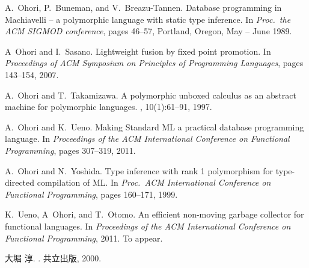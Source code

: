 \documentclass{jbook}
\begin{document}
\begin{thebibliography}{10}
A.~Ohori, P.~Buneman, and V.~Breazu-Tannen.
\newblock Database programming in {Machiavelli} -- a polymorphic language with
  static type inference.
\newblock In {\em Proc.\ the ACM SIGMOD conference}, pages 46--57, Portland,
  Oregon, May -- June 1989.

A~Ohori and I.~Sasano.
\newblock Lightweight fusion by fixed point promotion.
\newblock In {\em Proceedings of ACM Symposium on Principles of Programming
  Languages}, pages 143--154, 2007.

A.~Ohori and T.~Takamizawa.
\newblock A polymorphic unboxed calculus as an abstract machine for polymorphic
  languages.
, 10(1):61--91, 1997.

A.~Ohori and K.~Ueno.
\newblock Making {Standard ML} a practical database programming language.
\newblock In {\em Proceedings of the ACM International Conference on Functional
  Programming}, pages 307--319, 2011.

A.~Ohori and N.~Yoshida.
\newblock Type inference with rank 1 polymorphism for type-directed compilation
  of {ML}.
\newblock In {\em Proc.\ ACM International Conference on Functional
  Programming}, pages 160--171, 1999.

K.~Ueno, A~Ohori, and T.~Otomo.
\newblock An efficient non-moving garbage collector for functional languages.
\newblock In {\em Proceedings of the ACM International Conference on Functional
  Programming}, 2011.
\newblock To appear.

大堀 淳.
.
\newblock 共立出版, 2000.

\end{thebibliography}

 
\end{document}

